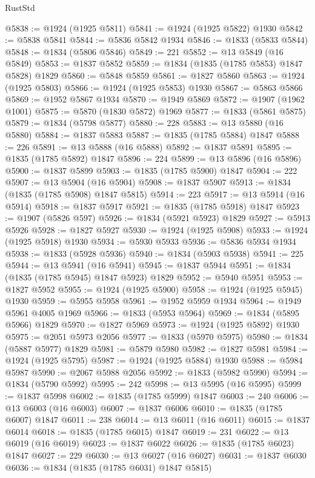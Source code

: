 \begin{lexlean}{RustStd}
\begin{coremodule}
@5838 := @1924 (@1925 @5811)
@5841 := @1924 (@1925 @5822) @1930
@5842 := @5838 @5841
@5844 := @5836 @5842 @1934
@5846 := @1833 (@5833 @5844)
@5848 := @1834 (@5806 @5846)
@5849 := 221
@5852 := @13 @5849 (@16 @5849)
@5853 := @1837 @5852
@5859 := @1834 (@1835 (@1785 @5853) @1847 @5828) @1829
@5860 := @5848 @5859
@5861 := @1827 @5860
@5863 := @1924 (@1925 @5803)
@5866 := @1924 (@1925 @5853) @1930
@5867 := @5863 @5866
@5869 := @1952 @5867 @1934
@5870 := @1949 @5869
@5872 := @1907 (@1962 @1001)
@5875 := @5870 (@1830 @5872) @1969
@5877 := @1833 (@5861 @5875)
@5879 := @1834 (@5798 @5877)
@5880 := 228
@5883 := @13 @5880 (@16 @5880)
@5884 := @1837 @5883
@5887 := @1835 (@1785 @5884) @1847
@5888 := 226
@5891 := @13 @5888 (@16 @5888)
@5892 := @1837 @5891
@5895 := @1835 (@1785 @5892) @1847
@5896 := 224
@5899 := @13 @5896 (@16 @5896)
@5900 := @1837 @5899
@5903 := @1835 (@1785 @5900) @1847
@5904 := 222
@5907 := @13 @5904 (@16 @5904)
@5908 := @1837 @5907
@5913 := @1834 (@1835 (@1785 @5908) @1847 @5815)
@5914 := 223
@5917 := @13 @5914 (@16 @5914)
@5918 := @1837 @5917
@5921 := @1835 (@1785 @5918) @1847
@5923 := @1907 (@5826 @597)
@5926 := @1834 (@5921 @5923) @1829
@5927 := @5913 @5926
@5928 := @1827 @5927
@5930 := @1924 (@1925 @5908)
@5933 := @1924 (@1925 @5918) @1930
@5934 := @5930 @5933
@5936 := @5836 @5934 @1934
@5938 := @1833 (@5928 @5936)
@5940 := @1834 (@5903 @5938)
@5941 := 225
@5944 := @13 @5941 (@16 @5941)
@5945 := @1837 @5944
@5951 := @1834 (@1835 (@1785 @5945) @1847 @5923) @1829
@5952 := @5940 @5951
@5953 := @1827 @5952
@5955 := @1924 (@1925 @5900)
@5958 := @1924 (@1925 @5945) @1930
@5959 := @5955 @5958
@5961 := @1952 @5959 @1934
@5964 := @1949 @5961 @4005 @1969
@5966 := @1833 (@5953 @5964)
@5969 := @1834 (@5895 @5966) @1829
@5970 := @1827 @5969
@5973 := @1924 (@1925 @5892) @1930
@5975 := @2051 @5973 @2056
@5977 := @1833 (@5970 @5975)
@5980 := @1834 (@5887 @5977) @1829
@5981 := @5879 @5980
@5982 := @1827 @5981
@5984 := @1924 (@1925 @5795)
@5987 := @1924 (@1925 @5884) @1930
@5988 := @5984 @5987
@5990 := @2067 @5988 @2056
@5992 := @1833 (@5982 @5990)
@5994 := @1834 (@5790 @5992)
@5995 := 242
@5998 := @13 @5995 (@16 @5995)
@5999 := @1837 @5998
@6002 := @1835 (@1785 @5999) @1847
@6003 := 240
@6006 := @13 @6003 (@16 @6003)
@6007 := @1837 @6006
@6010 := @1835 (@1785 @6007) @1847
@6011 := 238
@6014 := @13 @6011 (@16 @6011)
@6015 := @1837 @6014
@6018 := @1835 (@1785 @6015) @1847
@6019 := 231
@6022 := @13 @6019 (@16 @6019)
@6023 := @1837 @6022
@6026 := @1835 (@1785 @6023) @1847
@6027 := 229
@6030 := @13 @6027 (@16 @6027)
@6031 := @1837 @6030
@6036 := @1834 (@1835 (@1785 @6031) @1847 @5815)

\end{coremodule}
\end{lexlean}
